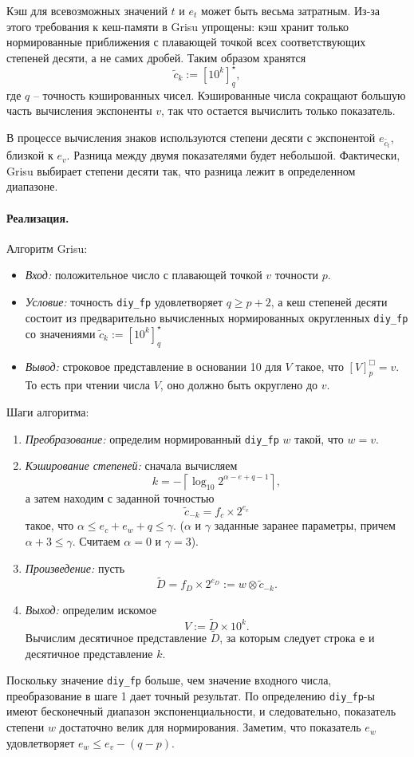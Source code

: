 Кэш для всевозможных значений $t$ и $e_t$ может быть весьма затратным. 
Из-за этого требования к кеш-памяти в \textsf{Grisu} упрощены: кэш хранит только нормированные приближения с плавающей точкой всех соответствующих степеней десяти, а не самих дробей. Таким образом хранятся $$\tilde{c}_k := \left[ 10^k \right]_q^{\star},$$ где $q$ -- точность кэшированных чисел.
Кэшированные числа сокращают большую часть вычисления экспоненты $v$, так что остается вычислить только показатель. 

В процессе вычисления знаков используются степени десяти с экспонентой $e_{\tilde{c_t}}$, близкой к $e_v$. 
Разница между двумя показателями будет небольшой.
Фактически, \textsf{Grisu} выбирает степени десяти так, что разница лежит в определенном диапазоне. 

\paragraph{Реализация.}
Алгоритм \textsf{Grisu}: \begin{itemize}
\item \textit{Вход:} положительное число с плавающей точкой $v$ точности $p$.
\item \textit{Условие:} точность \texttt{diy\_fp} удовлетворяет $q \geqslant p + 2$, а кеш степеней десяти состоит из предварительно вычисленных нормированных округленных  \texttt{diy\_fp} со значениями $\tilde{c}_k := \left[ 10^k \right]_q^{\star}$
\item \textit{Вывод:} строковое представление в основании 10 для $V$ такое, что $[V]^{\Box}_p = v$. 
То есть при чтении числа $V$, оно должно быть округлено до $v$.
\end{itemize}

Шаги алгоритма:
\begin{enumerate}
\item \textit{Преобразование:} определим нормированный \texttt{diy\_fp} $w$ такой, что $w = v$.
\item \textit{Кэширование степеней:} сначала вычисляем $$k = -\left\lceil \log_{10} {2^{\alpha -e+q-1}} \right\rceil,$$  а затем находим с заданной точностью $$\tilde{c}_{-k} = f_c \times 2^{e_c}$$ такое, что $\alpha \leqslant e_c + e_w + q \leqslant \gamma$. ($\alpha$ и $\gamma$ заданные заранее параметры, причем $\alpha + 3 \leqslant \gamma$. Считаем $\alpha=0$ и $\gamma=3$).
\item \textit{Произведение:} пусть $$\tilde{D} = f_D \times 2^{e_D} := w \otimes \tilde{c}_{-k}.$$
\item \textit{Выход:} определим искомое $$V := \tilde{D} \times 10^k.$$ 
Вычислим десятичное представление $\tilde{D}$, за которым следует строка \texttt{e} и десятичное представление $k$.
\end{enumerate}
Поскольку значение \texttt{diy\_fp} больше, чем значение входного числа, преобразование в шаге 1 дает точный результат. 
По определению \texttt{diy\_fp}-ы имеют бесконечный диапазон экспоненциальности, и следовательно, показатель степени $w$ достаточно велик для нормирования. 
Заметим, что показатель $e_w$ удовлетворяет $e_w \leqslant e_v - (q - p)$. 
 
